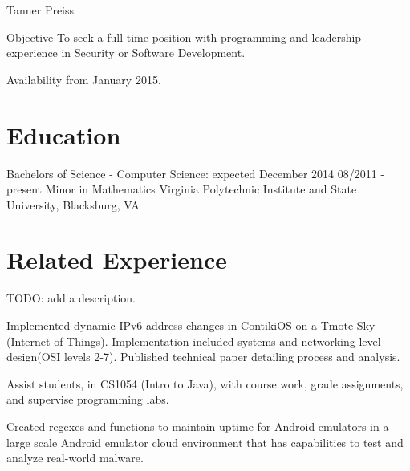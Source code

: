 \documentclass{tpreiss_cv}
\begin{document}
Tanner Preiss



Objective   To seek a full time position with programming and leadership experience in Security or Software Development.

Availability from January 2015.

\section{Education}
Bachelors of Science - Computer Science: expected December 2014 	                                 08/2011 - present
Minor in Mathematics
Virginia Polytechnic Institute and State University, Blacksburg, VA


\section{Related Experience}


TODO: add a description.



Implemented dynamic IPv6 address changes in ContikiOS on a Tmote Sky (Internet of Things). Implementation included systems and networking level design(OSI levels 2-7). Published technical paper detailing process and analysis. 


Assist students, in CS1054 (Intro to Java), with course work, grade assignments, and supervise programming labs.


Created regexes and functions to maintain uptime for Android emulators in a large scale Android emulator cloud environment that has capabilities to test and analyze real-world malware.

\end{document}
